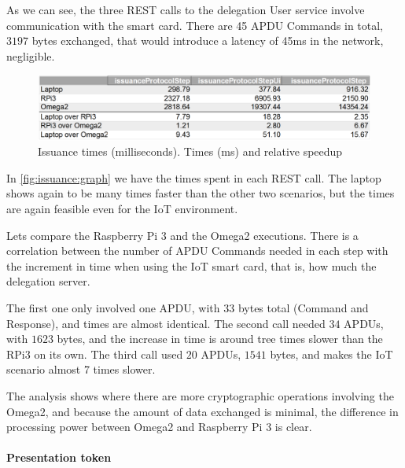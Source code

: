 \documentclass[journal]{IEEEtran}
\begin{document}
As we can see, the three REST calls to the delegation User service involve communication with the smart card. There are 45 APDU Commands in total, $3197$ bytes exchanged, that would introduce a latency of 45ms in the network, negligible.


\begin{figure}[bth]
	\includegraphics[width=\linewidth]{gfx/graphics/issuancetable}
	\caption{Issuance times (milliseconds). Times (ms) and relative speedup}
	\label{fig:issuance:graph}
\end{figure}


In \autoref{fig:issuance:graph} we have the times spent in each REST call. The laptop shows again to be many times faster than the other two scenarios, but the times are again feasible even for the IoT environment.

Lets compare the Raspberry Pi 3 and the Omega2 executions. There is a correlation between the number of APDU Commands needed in each step with the increment in time when using the IoT smart card, that is, how much the delegation server.

The first one only involved one APDU, with $33$ bytes total (Command and Response), and times are almost identical. The second call needed $34$ APDUs, with $1623$ bytes, and the increase in time is around tree times slower than the RPi3 on its own. The third call used $20$ APDUs, $1541$ bytes, and makes the IoT scenario almost 7 times slower.

The analysis shows where there are more cryptographic operations involving the Omega2, and because the amount of data exchanged is minimal, the difference in processing power between Omega2 and Raspberry Pi 3 is clear.



\paragraph{Presentation token}\hfil
\end{document}
